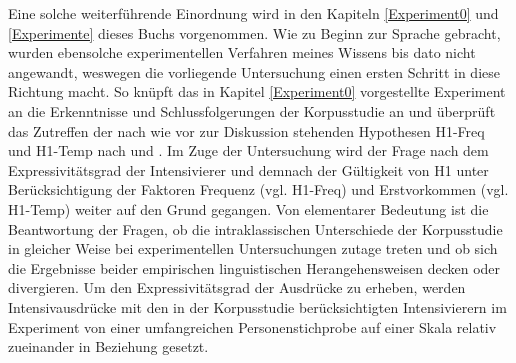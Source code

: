 Eine solche weiterführende Einordnung wird in den Kapiteln \ref{Experiment0} und \ref{Experimente} dieses Buchs vorgenommen. Wie zu Beginn zur Sprache gebracht, wurden ebensolche experimentellen Verfahren meines Wissens bis dato nicht angewandt, weswegen die vorliegende Untersuchung einen ersten Schritt in diese Richtung macht. So knüpft das in Kapitel \ref{Experiment0} vorgestellte Experiment an die Erkenntnisse und Schlussfolgerungen der Korpusstudie an und überprüft das Zutreffen der nach wie vor zur Diskussion stehenden Hypothesen H1-Freq und H1-Temp nach \citet[2]{Hauschild.1899} und \citet[59]{Tobler.1868}. Im Zuge der Untersuchung wird der Frage nach dem Expressivitätsgrad der Intensivierer und demnach der Gültigkeit von H1 unter Berücksichtigung der Faktoren Frequenz (vgl. H1-Freq) und Erstvorkommen (vgl. H1-Temp) weiter auf den Grund gegangen. Von elementarer Bedeutung ist die Beantwortung der Fragen, ob die intraklassischen Unterschiede der Korpusstudie in gleicher Weise bei experimentellen Untersuchungen zutage treten und ob sich die Ergebnisse beider empirischen linguistischen Herangehensweisen decken oder divergieren. Um den Expressivitätsgrad der Ausdrücke zu erheben, werden Intensivausdrücke mit den in der Korpusstudie berücksichtigten Intensivierern im Experiment von einer umfangreichen Personenstichprobe auf einer Skala relativ zueinander in Beziehung gesetzt.
